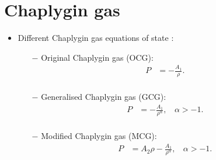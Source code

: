 \documentclass{beamer}
\begin{document}
\section{Chaplygin gas}
\begin{frame}
\begin{itemize}
\frametitle{\insertsectionhead}
\item Different Chaplygin gas equations of state \citep{kahya2015universe}:
\begin{itemize}
\item[$-$] Original Chaplygin gas (OCG):
\begin{equation}\label{eq:OCG}
\begin{split}
P &= -\frac{A_{1}}{\rho}.         \\
\end{split}
\end{equation}
\item[$-$] Generalised Chaplygin gas (GCG):
\begin{equation}\label{eq:GCG}
\begin{split}
P &= -\frac{A_{1}}{\rho^{\alpha}},\ \ \ \ \alpha>-1.         \\
\end{split}
\end{equation}
\item[$-$] Modified Chaplygin gas (MCG):
\begin{equation}\label{eq:MCG}
\begin{split}
P &=A_{2}\rho -\frac{A_{1}}{\rho^{\alpha}},\ \ \ \ \alpha>-1.        \\
\end{split}
\end{equation}
\end{itemize}
\end{itemize}
\end{frame}
\end{document}
